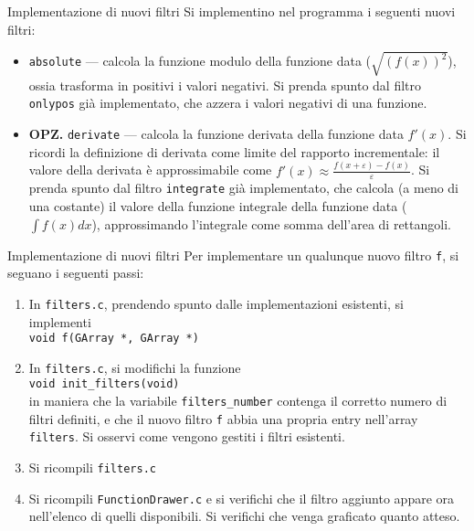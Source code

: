 \documentclass{beamer}
\begin{document}
\begin{frame}[fragile]{Implementazione di nuovi filtri}
Si implementino nel programma i seguenti nuovi filtri:
\begin{itemize}
 \item \texttt{absolute} --- calcola la funzione modulo della funzione data ($\sqrt{(f(x))^2}$), ossia trasforma in positivi i valori negativi. Si prenda spunto dal filtro \texttt{onlypos} già implementato, che azzera i valori negativi di una funzione.
 \item \textbf{OPZ.} \texttt{derivate} --- calcola la funzione derivata della funzione data $f'(x)$. Si ricordi la definizione di derivata come limite del rapporto incrementale: il valore della derivata è approssimabile come $f'(x) \approx \frac{f(x + \varepsilon) - f(x)}{\varepsilon}$. Si prenda spunto dal filtro \texttt{integrate} già implementato, che calcola (a meno di una costante) il valore della funzione integrale della funzione data ($\int{f(x)dx}$), approssimando l'integrale come somma dell'area di rettangoli.
\end{itemize}
\end{frame}

\begin{frame}[fragile]{Implementazione di nuovi filtri}
Per implementare un qualunque nuovo filtro \texttt{f}, si seguano i seguenti passi:
\begin{enumerate}
 \item In \texttt{filters.c}, prendendo spunto dalle implementazioni esistenti, si implementi \\ \texttt{void f(GArray *, GArray *)}
 \item In \texttt{filters.c}, si modifichi la funzione \\ \texttt{void init\_filters(void)} \\ in maniera che la variabile \texttt{filters\_number} contenga il corretto numero di filtri definiti, e che il nuovo filtro \texttt{f} abbia una propria entry nell'array \texttt{filters}. Si osservi come vengono gestiti i filtri esistenti.
 \item Si ricompili \texttt{filters.c}
 \item Si ricompili \texttt{FunctionDrawer.c} e si verifichi che il filtro aggiunto appare ora nell'elenco di quelli disponibili. Si verifichi che venga graficato quanto atteso.
\end{enumerate}
\end{frame}
\end{document}
